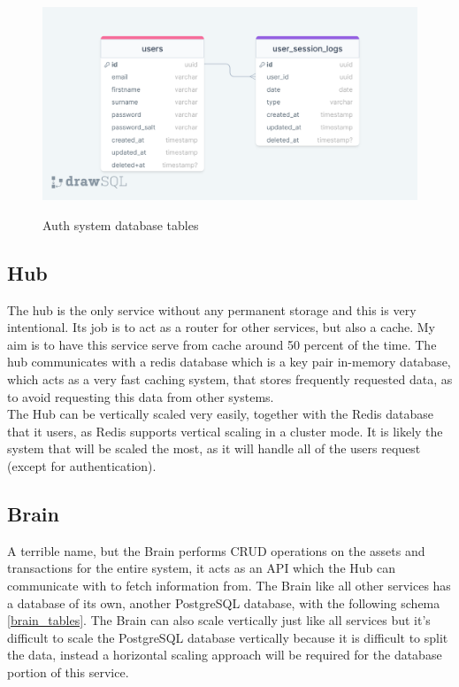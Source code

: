 \documentclass[titlepage]{article}
\begin{document}
\begin{figure}
\includegraphics[width=1\textwidth]{auth_diagram.png}
  \label{auth_tables}
  \caption{Auth system database tables}
\centering
\end{figure}

\subsection{Hub}
The hub is the only service without any permanent storage and this is very intentional. Its job is to act as a router for other services, but also a cache. My aim is to have this service serve from cache around 50 percent of the time. The hub communicates with a redis database which is a key pair in-memory database, which acts as a very fast caching system, that stores frequently requested data, as to avoid requesting this data from other systems. \\

The Hub can be vertically scaled very easily, together with the Redis database that it users, as Redis supports vertical scaling in a cluster mode. It is likely the system that will be scaled the most, as it will handle all of the users request (except for authentication).

\subsection{Brain}
A terrible name, but the Brain performs CRUD operations on the assets and transactions for the entire system, it acts as an API which the Hub can communicate with to fetch information from. The Brain like all other services has a database of its own, another PostgreSQL database, with the following schema \ref{brain_tables}. The Brain can also scale vertically just like all services but it's difficult to scale the PostgreSQL database vertically because it is difficult to split the data, instead a horizontal scaling approach will be required for the database portion of this service. \\
\end{document}
